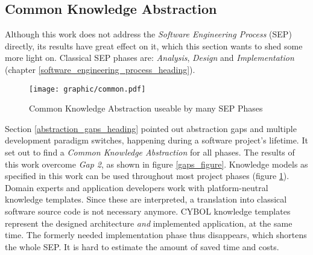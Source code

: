 %
%
%
%
%
%
%

\subsection{Common Knowledge Abstraction}
\label{common_knowledge_abstraction_heading}

Although this work does not address the \emph{Software Engineering Process}
(SEP) directly, its results have great effect on it, which this section wants to
shed some more light on. Classical SEP phases are: \emph{Analysis}, \emph{Design}
and \emph{Implementation} (chapter \ref{software_engineering_process_heading}).

\begin{figure}[ht]
    \begin{center}
        \texttt{[image: graphic/common.pdf]}
        \caption{Common Knowledge Abstraction useable by many SEP Phases}
        \label{common_figure}
    \end{center}
\end{figure}

Section \ref{abstraction_gaps_heading} pointed out abstraction gaps and
multiple development paradigm switches, happening during a software project's
lifetime. It set out to find a \emph{Common Knowledge Abstraction} for all
phases. The results of this work overcome \emph{Gap 2}, as shown in figure
\ref{gaps_figure}. Knowledge models as specified in this work can be used
throughout most project phases (figure \ref{common_figure}). Domain experts and
application developers work with platform-neutral knowledge templates. Since
these are interpreted, a translation into classical software source code is not
necessary anymore. CYBOL knowledge templates represent the designed
architecture \emph{and} implemented application, at the same time. The formerly
needed implementation phase thus disappears, which shortens the whole SEP. It
is hard to estimate the amount of saved time and costs.

